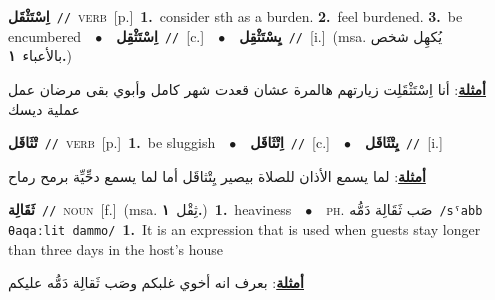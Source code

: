 \documentclass[10pt,a4paper,twoside]{article} %
\begin{document}
\begin{multicols}{2}
{\setlength\topsep{0pt}\textbf{\foreignlanguage{arabic}{اِسْتَثْقَل}}\ {\color{gray}\texttt{//}\color{black}}\ \textsc{verb}\ [p.]\ \textbf{1.}~consider sth as a burden.  \textbf{2.}~feel burdened.  \textbf{3.}~be encumbered\ \ $\bullet$\ \ \setlength\topsep{0pt}\textbf{\foreignlanguage{arabic}{اِسْتَثْقِل}}\ {\color{gray}\texttt{//}\color{black}}\ [c.]\ \ $\bullet$\ \ \setlength\topsep{0pt}\textbf{\foreignlanguage{arabic}{يِسْتَثْقِل}}\ {\color{gray}\texttt{//}\color{black}}\ [i.]\ \color{gray}(msa. \foreignlanguage{arabic}{يُكهِل شخص بالأعباء}~\foreignlanguage{arabic}{\textbf{١.}})\color{black}\  \begin{flushright}\color{gray}\foreignlanguage{arabic}{\textbf{\underline{\foreignlanguage{arabic}{أمثلة}}}: أنا اِسْتَثْقَلِت زيارتهم هالمرة عشان قعدت شهر كامل وأبوي بقى مرضان عمل عملية ديسك}\end{flushright}\color{black}} \vspace{2mm}

{\setlength\topsep{0pt}\textbf{\foreignlanguage{arabic}{تْثَاقَل}}\ {\color{gray}\texttt{//}\color{black}}\ \textsc{verb}\ [p.]\ \textbf{1.}~be sluggish\ \ $\bullet$\ \ \setlength\topsep{0pt}\textbf{\foreignlanguage{arabic}{اِتْثَاقَل}}\ {\color{gray}\texttt{//}\color{black}}\ [c.]\ \ $\bullet$\ \ \setlength\topsep{0pt}\textbf{\foreignlanguage{arabic}{يِتْثَاقَل}}\ {\color{gray}\texttt{//}\color{black}}\ [i.]\  \begin{flushright}\color{gray}\foreignlanguage{arabic}{\textbf{\underline{\foreignlanguage{arabic}{أمثلة}}}: لما يسمع الأذان للصلاة بيصير يِتْثاقَل أما لما يسمع دحِّيِّة برمح رماح}\end{flushright}\color{black}} \vspace{2mm}

{\setlength\topsep{0pt}\textbf{\foreignlanguage{arabic}{ثَقَالِة}}\ {\color{gray}\texttt{//}\color{black}}\ \textsc{noun}\ [f.]\ \color{gray}(msa. \foreignlanguage{arabic}{ثِقْل}~\foreignlanguage{arabic}{\textbf{١.}})\color{black}\ \textbf{1.}~heaviness\ \ $\bullet$\ \ \textsc{ph.} \color{gray} \foreignlanguage{arabic}{صَب ثَقَالِة دَمُّه}\color{black}\ {\color{gray}\texttt{/{\sffamily sˤabb θaqaːlit dammo}/}\color{black}}\ \textbf{1.}~It is an expression that is used when guests stay longer than three days in the host's house\  \begin{flushright}\color{gray}\foreignlanguage{arabic}{\textbf{\underline{\foreignlanguage{arabic}{أمثلة}}}: بعرف انه أخوي غلبكم وصَب ثَقالِة دَمُّه عليكم}\end{flushright}\color{black}} \vspace{2mm}


\end{multicols}
\end{document}
